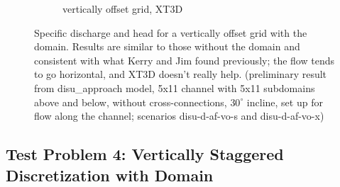 \documentclass{article}
\begin{document}
\begin{figure}[H]
\begin{subfigure}{0.4\textwidth}
	\caption{vertically offset grid, XT3D}
	\label{fig:disu-x-nocc-head}
\end{subfigure}
\caption{Specific discharge and head for a vertically offset grid with the domain. Results are similar to those without the domain and consistent with what Kerry and Jim found previously; the flow tends to go horizontal, and XT3D doesn't really help. (preliminary result from disu\_approach model, 5x11 channel with 5x11 subdomains above and below, without cross-connections, $30^{\circ}$ incline, set up for flow along the channel; scenarios disu-d-af-vo-s and disu-d-af-vo-x)}
\label{fig:figures}
\end{figure}

\subsection{Test Problem 4: Vertically Staggered Discretization with Domain}
\end{document}

